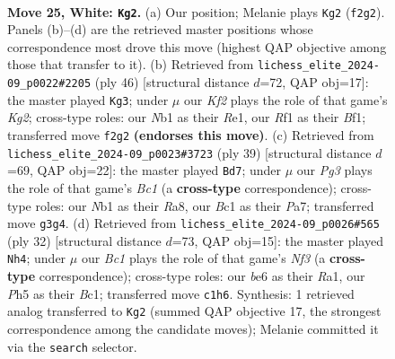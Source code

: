 \documentclass[11pt]{article}
\begin{document}
\clearpage

\begin{figure}[p]\centering
\begin{subfigure}{0.46\textwidth}\centering
\resizebox{\linewidth}{!}{%
\newchessgame
\chessboard[
  setfen={rn3r2/1p1kb1pp/p3b3/3pPp1P/8/P5P1/4NK2/RNB2R2 w - - 2 25},
  showmover=false,
  pgfstyle=straightmove, color=movearrow, markmove={f2-g2}
]}
\caption{}
\end{subfigure}\hfill
\begin{subfigure}{0.46\textwidth}\centering
\resizebox{\linewidth}{!}{%
\newchessgame
\chessboard[
  setfen={r3r1k1/pp3p2/2p1b1p1/8/2PRPPn1/2N5/PP4K1/4RB2 w - - 1 24},
  showmover=false,
  pgfstyle=straightmove, color=movearrow, markmove={g2-g3}
]}
\caption{}
\end{subfigure}
\\[4pt]
\begin{subfigure}{0.46\textwidth}\centering
\resizebox{\linewidth}{!}{%
\newchessgame
\chessboard[
  setfen={r1b2rk1/ppb3p1/4pn1p/8/1PP5/P2B3P/3B1PP1/3RR1K1 b - - 0 20},
  showmover=false,
  pgfstyle=straightmove, color=movearrow, markmove={c8-d7}
]}
\caption{}
\end{subfigure}\hfill
\begin{subfigure}{0.46\textwidth}\centering
\resizebox{\linewidth}{!}{%
\newchessgame
\chessboard[
  setfen={r1b1r3/ppk3p1/2nb3p/5p2/8/2PB1N2/P4PPP/R1BR2K1 w - - 4 17},
  showmover=false,
  pgfstyle=straightmove, color=movearrow, markmove={f3-h4}
]}
\caption{}
\end{subfigure}
\caption{\textbf{Move 25, White: \texttt{Kg2}.} (a) Our position; Melanie plays \texttt{Kg2} (\texttt{f2g2}). Panels (b)--(d) are the retrieved master positions whose correspondence most drove this move (highest QAP objective among those that transfer to it). (b) Retrieved from \texttt{lichess\_elite\_2024-09\_p0022\#2205} (ply 46) [structural distance $d$=72, QAP obj=17]: the master played \texttt{Kg3}; under $\mu$ our \emph{Kf2} plays the role of that game's \emph{Kg2}; cross-type roles: our \emph{N}b1 as their \emph{R}e1, our \emph{R}f1 as their \emph{B}f1; transferred move \texttt{f2g2} \textbf{(endorses this move)}. (c) Retrieved from \texttt{lichess\_elite\_2024-09\_p0023\#3723} (ply 39) [structural distance $d$=69, QAP obj=22]: the master played \texttt{Bd7}; under $\mu$ our \emph{Pg3} plays the role of that game's \emph{Bc1} (a \textbf{cross-type} correspondence); cross-type roles: our \emph{N}b1 as their \emph{R}a8, our \emph{B}c1 as their \emph{P}a7; transferred move \texttt{g3g4}. (d) Retrieved from \texttt{lichess\_elite\_2024-09\_p0026\#565} (ply 32) [structural distance $d$=73, QAP obj=15]: the master played \texttt{Nh4}; under $\mu$ our \emph{Bc1} plays the role of that game's \emph{Nf3} (a \textbf{cross-type} correspondence); cross-type roles: our \emph{b}e6 as their \emph{R}a1, our \emph{P}h5 as their \emph{B}c1; transferred move \texttt{c1h6}. Synthesis: 1 retrieved analog transferred to \texttt{Kg2} (summed QAP objective 17, the strongest correspondence among the candidate moves); Melanie committed it via the \texttt{search} selector.}
\label{fig:thought-m48}
\end{figure}
\end{document}
